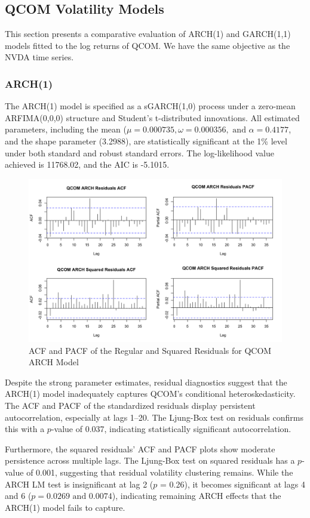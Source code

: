 \documentclass[12pt]{article}
\begin{document}
\subsection*{QCOM Volatility Models}

This section presents a comparative evaluation of ARCH(1) and GARCH(1,1) models fitted to the log returns of QCOM. We have the same objective as the NVDA time series.

\subsubsection*{ARCH(1)}

The ARCH(1) model is specified as a sGARCH(1,0) process under a zero-mean ARFIMA(0,0,0) structure and Student’s t-distributed innovations. All estimated parameters, including the mean ($\mu = 0.000735, \omega=0.000356, \text{ and } \alpha =0.4177$, and the shape parameter (3.2988), are statistically significant at the 1\% level under both standard and robust standard errors. The log-likelihood value achieved is 11768.02, and the AIC is -5.1015.

\begin{figure}[!h]
	\centering
	\includegraphics[width=0.8\linewidth]{plots/ARCH_QCOM.png}
	\caption{ACF and PACF of the Regular and Squared Residuals for QCOM ARCH Model}
	\label{fig:nvda_garch}
\end{figure}

Despite the strong parameter estimates, residual diagnostics suggest that the ARCH(1) model inadequately captures QCOM’s conditional heteroskedasticity. The ACF and PACF of the standardized residuals display persistent autocorrelation, especially at lags 1–20. The Ljung-Box test on residuals confirms this with a $p$-value of 0.037, indicating statistically significant autocorrelation.

Furthermore, the squared residuals’ ACF and PACF plots show moderate persistence across multiple lags. The Ljung-Box test on squared residuals has a $p$-value of 0.001, suggesting that residual volatility clustering remains. While the ARCH LM test is insignificant at lag 2 ($p$ = 0.26), it becomes significant at lags 4 and 6 ($p = 0.0269 \text{ and } 0.0074$), indicating remaining ARCH effects that the ARCH(1) model fails to capture.
\end{document}
